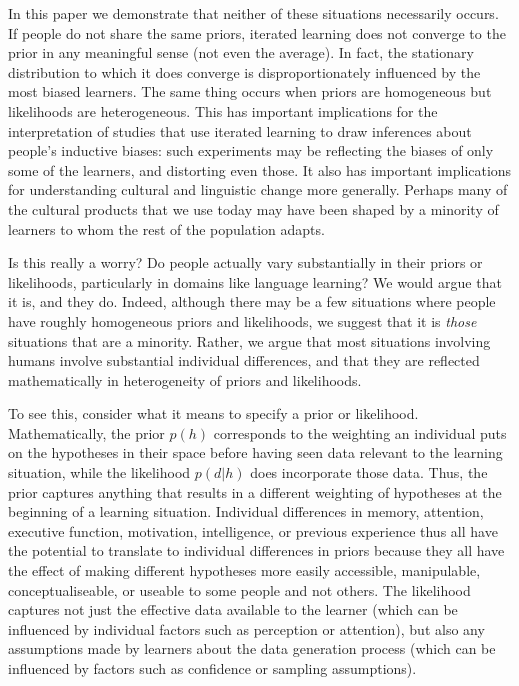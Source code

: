 \documentclass[doc]{apa6}
\begin{document}
In this paper we demonstrate that neither of these situations necessarily occurs. If people do not share the same priors, iterated learning does not converge to the prior in any meaningful sense (not even the average). In fact, the stationary distribution to which it does converge is disproportionately influenced by the most biased learners. The same thing occurs when priors are homogeneous but likelihoods are heterogeneous. This has important implications for the interpretation of studies that use iterated learning to draw inferences about people's inductive biases: such experiments may be reflecting the biases of only some of the learners, and distorting even those. It also has important implications for understanding cultural and linguistic change more generally. Perhaps many of the cultural products that we use today may have been shaped by a minority of learners to whom the rest of the population adapts. 

Is this really a worry? Do people actually vary substantially in their priors or likelihoods, particularly in domains like language learning? We would argue that it is, and they do. Indeed, although there may be a few situations where people have roughly homogeneous priors and likelihoods, we suggest that it is {\it those} situations that are a minority. Rather, we argue that most situations involving humans involve substantial individual differences, and that they are reflected mathematically in heterogeneity of priors and likelihoods. 

To see this, consider what it means to specify a prior or likelihood. Mathematically, the prior $p(h)$ corresponds to the weighting an individual puts on the hypotheses in their space before having seen data relevant to the learning situation, while the likelihood $p(d|h)$ does incorporate those data. Thus, the prior captures anything that results in a different weighting of hypotheses at the beginning of a learning situation. Individual differences in memory, attention, executive function, motivation, intelligence, or previous experience thus all have the potential to translate to individual differences in priors because they all have the effect of making different hypotheses more easily accessible, manipulable, conceptualiseable, or useable to some people and not others. The likelihood captures not just the effective data available to the learner (which can be influenced by individual factors such as perception or attention), but also any assumptions made by learners about the data generation process (which can be influenced by factors such as confidence or sampling assumptions). 
\end{document}
